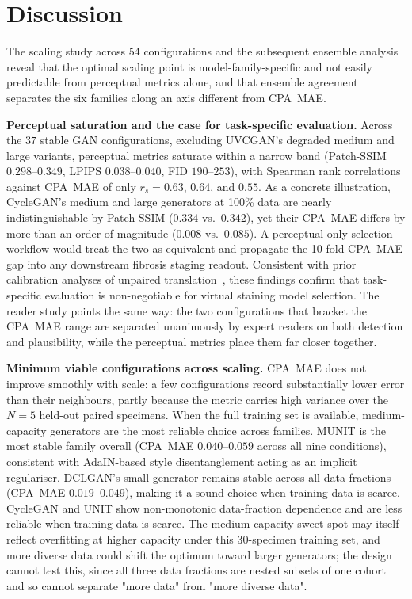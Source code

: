 
\section{Discussion}
\label{sec:discussion}

The scaling study across 54 configurations and the subsequent ensemble analysis reveal
that the optimal scaling point is model-family-specific and not easily predictable
from perceptual metrics alone, and that ensemble agreement separates the six families
along an axis different from CPA~MAE.

\noindent\textbf{Perceptual saturation and the case for task-specific evaluation.}
Across the $37$ stable GAN configurations, excluding UVCGAN's degraded medium and
large variants, perceptual metrics saturate within a narrow band
(Patch-SSIM $0.298$--$0.349$, LPIPS $0.038$--$0.040$, FID $190$--$253$), with Spearman
rank correlations against CPA~MAE of only $r_s{=}0.63$, $0.64$, and $0.55$.
As a concrete illustration, CycleGAN's medium and large generators at 100\% data are
nearly indistinguishable by Patch-SSIM ($0.334$ vs.\ $0.342$), yet their CPA~MAE
differs by more than an order of magnitude ($0.008$ vs.\ $0.085$).
A perceptual-only selection workflow would treat the two as equivalent and propagate
the 10-fold CPA~MAE gap into any downstream fibrosis staging readout.
Consistent with prior calibration analyses of unpaired
translation~\cite{trustworthy_i2i2025}, these findings confirm that task-specific
evaluation is non-negotiable for virtual staining model selection.
The reader study points the same way: the two configurations that bracket the CPA~MAE
range are separated unanimously by expert readers on both detection and plausibility,
while the perceptual metrics place them far closer together.

\noindent\textbf{Minimum viable configurations across scaling.}
CPA~MAE does not improve smoothly with scale: a few configurations record substantially
lower error than their neighbours, partly because the metric carries high variance over
the $N{=}5$ held-out paired specimens.
When the full training set is available, medium-capacity generators are the most reliable
choice across families.
MUNIT is the most stable family overall (CPA~MAE $0.040$--$0.059$ across all nine
conditions), consistent with AdaIN-based style disentanglement acting as an implicit
regulariser.
DCLGAN's small generator remains stable across all data fractions
(CPA~MAE $0.019$--$0.049$), making it a sound choice when training data is scarce.
CycleGAN and UNIT show non-monotonic data-fraction dependence and are less reliable when
training data is scarce.
The medium-capacity sweet spot may itself reflect overfitting at higher capacity under
this 30-specimen training set, and more diverse data could shift the optimum toward
larger generators; the design cannot test this, since all three data fractions are
nested subsets of one cohort and so cannot separate "more data" from "more diverse
data".

